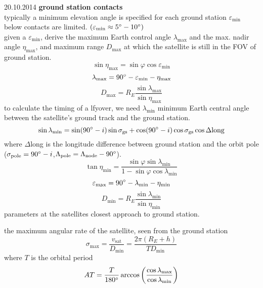 \begin{chapter}{20.10.2014}
\textbf{ground station contacts}\\
typically a minimum elevation angle is specified for each ground station $\varepsilon_\text{min}$ below contacts are limited. $(\varepsilon_\text{min} \approx 5\degree-10\degree)$\\
given a $\varepsilon_\text{min}$, derive the maximum Earth control angle $\lambda_\text{max}$ and the max. nadir angle $\eta_\text{max}$, and maximum range $D_\text{max}$ at which the satellite is still in the FOV of ground station.
\[\sin\eta_\text{max} = \sin\varphi\cos\varepsilon_\text{min}\]
\[\lambda_\text{max} = 90\degree -\varepsilon_\text{min} - \eta_\text{max}\]
\[D_\text{max} = R_E\frac{\sin\lambda_\text{max}}{\sin\eta_\text{max}}\]
to calculate the timing of a lfyover, we need $\lambda_\text{min}$ minimum Earth central angle between the satellite's ground track and the ground station.
\[ \sin \lambda_\text{min} = \sin (90\degree-i)\sin \sigma_\text{gs}+\cos (90\degree-i)\cos \sigma_\text{gs} \cos\Delta\text{long} \]
 where $\Delta$long is the longitude difference between ground station and the orbit pole \\($\sigma_\text{pole} = 90\degree -i$,$\Lambda_\text{pole} = \Lambda_\text{node}-90\degree$).
 \[ \tan \eta_\text{min} = \frac{\sin \varphi \sin \lambda_\text{min}}{1-\sin \varphi \cos \lambda_\text{min}} \]
 \[\varepsilon_\text{max} = 90\degree-\lambda_\text{min}-\eta_\text{min}\]
 \[D_\text{min} = R_E \frac{\sin \lambda_\text{min}}{\sin \eta_\text{min}}\]
 parameters at the satellites closest approach to ground station.
 
 the maximum angular rate of the satellite, seen from the ground station
 \[ \sigma_\text{max} = \frac{v_\text{sat}}{D_\text{min}}=\frac{2\pi(R_E + h)}{T D_\text{min}}\]
 where $T$ is the orbital period
  \[ AT = \frac{T}{180\degree} \arccos \left( \frac{\cos \lambda_\text{max}}{\cos \lambda_\text{min}} \right) \]
 
\end{chapter}
